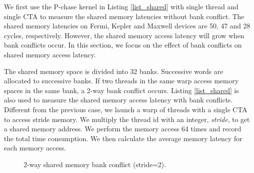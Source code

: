 \documentclass[10pt,journal,compsoc]{IEEEtran}
\theoremstyle{definition}
\begin{document}
We first use the P-chase kernel in Listing \ref{list_shared} with single thread and single CTA to measure the shared memory latencies without bank conflict. The shared memory latencies on Fermi, Kepler and Maxwell devices are 50, 47 and 28 cycles, respectively. However, the shared memory access latency will grow when bank conflicts occur. In this section, we focus on the effect of bank conflicts on shared memory access latency.

The shared memory space is divided into 32 banks. Successive words are allocated to successive banks. If two threads in the same warp access memory spaces in the same bank, a 2-way bank conflict occurs. Listing \ref{list_shared} is also used to measure the shared memory access latency with bank conflicts. Different from the previous case, we launch a warp of threads with a single CTA to access stride memory. We multiply the thread id with an integer, \emph{stride}, to get a shared memory address. We perform the memory access 64 times and record the total time consumption. We then calculate the average memory latency for each memory access.

\begin{figure}
\centering
{}
\vspace{-1em}
\caption{2-way shared memory bank conflict (stride=2).}
\label{fig:fermi_shared_demo}
\end{figure}
\end{document}
